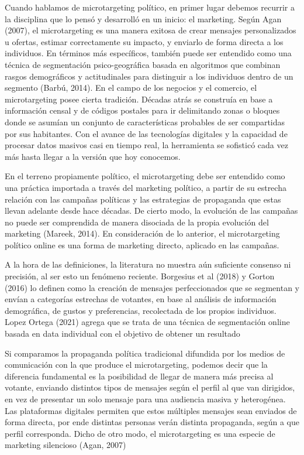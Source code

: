 \documentclass[
  10pt,
  letterpaper,
]{report}
\begin{document}
Cuando hablamos de microtargeting político, en primer lugar debemos
recurrir a la disciplina que lo pensó y desarrolló en un inicio: el
marketing. Según Agan (2007), el microtargeting es una manera exitosa de
crear mensajes personalizados u ofertas, estimar correctamente su
impacto, y enviarlo de forma directa a los individuos. En términos más
específicos, también puede ser entendido como una técnica de
segmentación psico-geográfica basada en algoritmos que combinan rasgos
demográficos y actitudinales para distinguir a los individuos dentro de
un segmento (Barbú, 2014). En el campo de los negocios y el comercio, el
microtargeting posee cierta tradición. Décadas atrás se construía en
base a información censal y de códigos postales para ir delimitando
zonas o bloques donde se asumían un conjunto de características
probables de ser compartidas por sus habitantes. Con el avance de las
tecnologías digitales y la capacidad de procesar datos masivos casi en
tiempo real, la herramienta se sofisticó cada vez más hasta llegar a la
versión que hoy conocemos.

En el terreno propiamente político, el microtargeting debe ser entendido
como una práctica importada a través del marketing político, a partir de
su estrecha relación con las campañas políticas y las estrategias de
propaganda que estas llevan adelante desde hace décadas. De cierto modo,
la evolución de las campañas no puede ser comprendida de manera
disociada de la propia evolución del marketing (Mareek, 2014). En
consideración de lo anterior, el microtargeting político online es una
forma de marketing directo, aplicado en las campañas.

A la hora de las definiciones, la literatura no muestra aún suficiente
consenso ni precisión, al ser esto un fenómeno reciente. Borgesius et al
(2018) y Gorton (2016) lo definen como la creación de mensajes
perfeccionados que se segmentan y envían a categorías estrechas de
votantes, en base al análisis de información demográfica, de gustos y
preferencias, recolectada de los propios individuos. Lopez Ortega (2021)
agrega que se trata de una técnica de segmentación online basada en data
individual con el objetivo de obtener un resultado

Si comparamos la propaganda política tradicional difundida por los
medios de comunicación con la que produce el microtargeting, podemos
decir que la diferencia fundamental es la posibilidad de llegar de
manera más precisa al votante, enviando distintos tipos de mensajes
según el perfil al que van dirigidos, en vez de presentar un solo
mensaje para una audiencia masiva y heterogénea. Las plataformas
digitales permiten que estos múltiples mensajes sean enviados de forma
directa, por ende distintas personas verán distinta propaganda, según a
que perfil corresponda. Dicho de otro modo, el microtargeting es una
especie de marketing silencioso (Agan, 2007)
\end{document}
